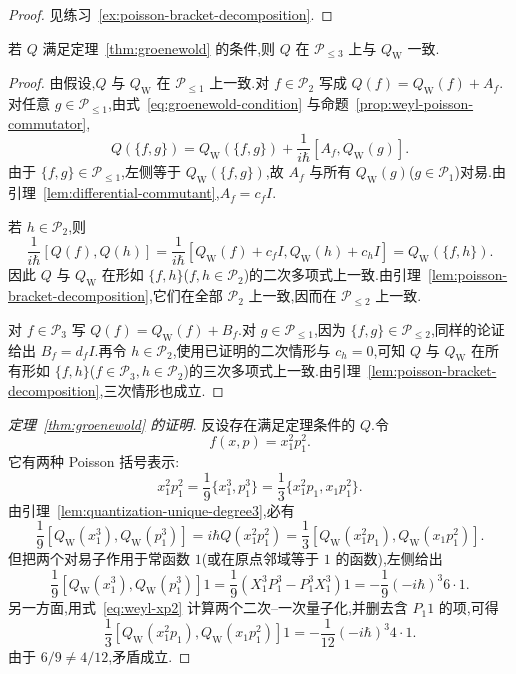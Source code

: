 {\begin{proof}
见练习~\ref{ex:poisson-bracket-decomposition}.
\end{proof}

\begin{lemma}[量子化在三次以下的唯一性]\label{lem:quantization-unique-degree3}
若 $Q$ 满足定理~\ref{thm:groenewold} 的条件,则 $Q$ 在 $\mathcal P_{\leq3}$ 上与 $Q_{\mathrm W}$ 一致.
\end{lemma}

\begin{proof}
由假设,$Q$ 与 $Q_{\mathrm W}$ 在 $\mathcal P_{\leq1}$ 上一致.对 $f\in\mathcal P_2$ 写成 $Q(f)=Q_{\mathrm W}(f)+A_f$.对任意 $g\in\mathcal P_{\leq1}$,由式~\eqref{eq:groenewold-condition} 与命题~\ref{prop:weyl-poisson-commutator},
\[
Q(\{f,g\})=Q_{\mathrm W}(\{f,g\})+\frac1{i\hbar}[A_f,Q_{\mathrm W}(g)].
\]
由于 $\{f,g\}\in\mathcal P_{\leq1}$,左侧等于 $Q_{\mathrm W}(\{f,g\})$,故 $A_f$ 与所有 $Q_{\mathrm W}(g)$($g\in\mathcal P_1$)对易.由引理~\ref{lem:differential-commutant},$A_f=c_fI$.

若 $h\in\mathcal P_2$,则
\[
\frac1{i\hbar}[Q(f),Q(h)]
=\frac1{i\hbar}[Q_{\mathrm W}(f)+c_fI,Q_{\mathrm W}(h)+c_hI]
=Q_{\mathrm W}(\{f,h\}).
\]
因此 $Q$ 与 $Q_{\mathrm W}$ 在形如 $\{f,h\}$($f,h\in\mathcal P_2$)的二次多项式上一致.由引理~\ref{lem:poisson-bracket-decomposition},它们在全部 $\mathcal P_2$ 上一致,因而在 $\mathcal P_{\leq2}$ 上一致.

对 $f\in\mathcal P_3$ 写 $Q(f)=Q_{\mathrm W}(f)+B_f$.对 $g\in\mathcal P_{\leq1}$,因为 $\{f,g\}\in\mathcal P_{\leq2}$,同样的论证给出 $B_f=d_fI$.再令 $h\in\mathcal P_2$,使用已证明的二次情形与 $c_h=0$,可知 $Q$ 与 $Q_{\mathrm W}$ 在所有形如 $\{f,h\}$($f\in\mathcal P_3,h\in\mathcal P_2$)的三次多项式上一致.由引理~\ref{lem:poisson-bracket-decomposition},三次情形也成立.
\end{proof}

\begin{proof}[定理~\ref{thm:groenewold} 的证明]
反设存在满足定理条件的 $Q$.令
\[
f(x,p)=x_1^2p_1^2.
\]
它有两种 Poisson 括号表示:
\[
x_1^2p_1^2=\frac19\{x_1^3,p_1^3\}
=\frac13\{x_1^2p_1,x_1p_1^2\}.
\]
由引理~\ref{lem:quantization-unique-degree3},必有
\[
\frac19[Q_{\mathrm W}(x_1^3),Q_{\mathrm W}(p_1^3)]
=i\hbar Q(x_1^2p_1^2)
=\frac13[Q_{\mathrm W}(x_1^2p_1),Q_{\mathrm W}(x_1p_1^2)].
\]
但把两个对易子作用于常函数 $1$(或在原点邻域等于 $1$ 的函数),左侧给出
\[
\frac19[Q_{\mathrm W}(x_1^3),Q_{\mathrm W}(p_1^3)]1
=\frac19(X_1^3P_1^3-P_1^3X_1^3)1
=-\frac19(-i\hbar)^3 6\cdot1.
\]
另一方面,用式~\eqref{eq:weyl-xp2} 计算两个二次--一次量子化,并删去含 $P_1 1$ 的项,可得
\[
\frac13[Q_{\mathrm W}(x_1^2p_1),Q_{\mathrm W}(x_1p_1^2)]1
=-\frac1{12}(-i\hbar)^3 4\cdot1.
\]
由于 $6/9\neq4/12$,矛盾成立.
\end{proof}

}
